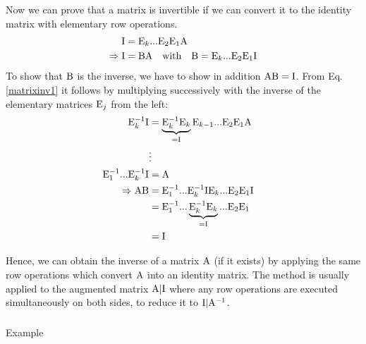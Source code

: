 \documentclass[
  letterpaper,
  DIV=11,
  numbers=noendperiod]{scrartcl}
\makeatletter
\let\oldsubparagraph\subparagraph
\renewcommand{\subparagraph}{
    \@ifstar
      \xxxSubParagraphStar
      \xxxSubParagraphNoStar
  }
\newcommand{\xxxSubParagraphStar}[1]{\oldsubparagraph*{#1}\mbox{}}
\newcommand{\xxxSubParagraphNoStar}[1]{\oldsubparagraph{#1}\mbox{}}
\theoremstyle{remark}
\makeatother
\begin{document}
Now we can prove that a matrix is invertible if we can convert it to the
identity matrix with elementary row operations. \[\begin{aligned}
{\rm I} &= {\rm E}_{k} ... {\rm E}_{2} {\rm E}_{1} {\rm A}  \label{matrixinv1}\\
 \Rightarrow   {\rm I} & = {\rm B}  {\rm A}  \quad \mbox{with} \quad  {\rm B} = {\rm E}_{k} ... {\rm E}_{2} {\rm E}_{1} {\rm I}  \nonumber
\end{aligned}\] To show that \({\rm B}\) is the inverse, we have to show
in addition \({\rm A}{\rm B} = {\rm I}\). From Eq.
\hyperref[matrixinv1]{{[}matrixinv1{]}} it follows by multiplying
successively with the inverse of the elementary matrices \({\rm E}_{j}\)
from the left: \[\begin{aligned}
{\rm E}_{k}^{-1}{\rm I} &=\underbrace{{\rm E}_{k}^{-1}{\rm E}_{k}}_{={\rm I}} {\rm E}_{k-1} ... {\rm E}_{2} {\rm E}_{1} {\rm A} \\
&\vdots &  \\
 {\rm E}_{1}^{-1}... {\rm E}_{k}^{-1}{\rm I} &=  {\rm A} \\
\Rightarrow {\rm A}  {\rm B} & ={\rm E}_{1}^{-1}... {\rm E}_{k}^{-1}{\rm I}  {\rm E}_{k} ... {\rm E}_{2} {\rm E}_{1} {\rm I}   \\
 & ={\rm E}_{1}^{-1}... \underbrace{{\rm E}_{k}^{-1}{\rm E}_{k}}_{={\rm I}} ... {\rm E}_{2} {\rm E}_{1} \\
 &= {\rm I}
\end{aligned}\]

Hence, we can obtain the inverse of a matrix \({\rm A}\) (if it exists)
by applying the same row operations which convert \({\rm A}\) into an
identity matrix. The method is usually applied to the augmented matrix
\({\rm A} \vert  {\rm  I}\) where any row operations are executed
simultaneously on both sides, to reduce it to
\({\rm I} \vert  {\rm A}^{-1}\).

\subparagraph{Example}\label{example-4}
\end{document}
